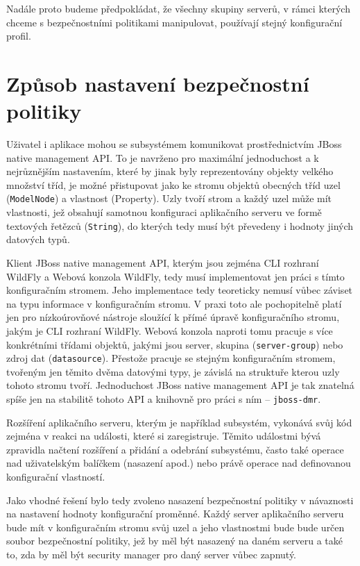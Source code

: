 Nadále proto budeme předpokládat, že všechny skupiny serverů, v rámci kterých chceme s bezpečnostními politikami manipulovat, používají stejný konfigurační profil.

\section{Způsob nastavení bezpečnostní politiky}

Uživatel i aplikace mohou se subsystémem komunikovat prostřednictvím JBoss native management API. To je navrženo pro maximální jednoduchost a k nejrůznějším nastavením, které by jinak byly reprezentovány objekty velkého množství tříd, je možné přistupovat jako ke stromu objektů obecných tříd uzel ({\tt ModelNode}) a vlastnost (Property). Uzly tvoří strom a každý uzel může mít vlastnosti, jež obsahují samotnou konfiguraci aplikačního serveru ve formě textových řetězců ({\tt String}), do kterých tedy musí být převedeny i hodnoty jiných datových typů. \cite{jbossDetypedManagement}

Klient JBoss native management API, kterým jsou zejména CLI rozhraní WildFly a Webová konzola WildFly, tedy musí implementovat jen práci s tímto konfiguračním stromem. Jeho implementace tedy teoreticky nemusí vůbec záviset na typu informace v konfiguračním stromu. V praxi toto ale pochopitelně platí jen pro nízkoúrovňové nástroje sloužící k přímé úpravě konfiguračního stromu, jakým je CLI rozhraní WildFly. Webová konzola naproti tomu pracuje s více konkrétními třídami objektů, jakými jsou server, skupina ({\tt server-group}) nebo zdroj dat ({\tt datasource}). Přestože pracuje se stejným konfiguračním stromem, tvořeným jen těmito dvěma datovými typy, je závislá na struktuře kterou uzly tohoto stromu tvoří. Jednoduchost JBoss native management API je tak znatelná spíše jen na stabilitě tohoto API a knihovně pro práci s ním -- {\tt jboss-dmr}. \cite{jbossDetypedManagement}

Rozšíření aplikačního serveru, kterým je například subsystém, vykonává svůj kód zejména v reakci na události, které si zaregistruje. Těmito událostmi bývá zpravidla načtení rozšíření a přidání a odebrání subsystému, často také operace nad uživatelským balíčkem (nasazení apod.) nebo právě operace nad definovanou konfigurační vlastností. \cite{WildFlyExtending}

Jako vhodné řešení bylo tedy zvoleno nasazení bezpečnostní politiky v návaznosti na nastavení hodnoty konfigurační proměnné. Každý server aplikačního serveru bude mít v konfiguračním stromu svůj uzel a jeho vlastnostmi bude bude určen soubor bezpečnostní politiky, jež by měl být nasazený na daném serveru a také to, zda by měl být security manager pro daný server vůbec zapnutý.

